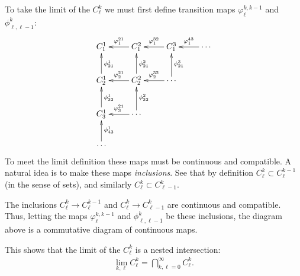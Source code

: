       To take the limit of the $C^k_\ell$ we must first define transition maps $\varphi^{k,k-1}_\ell$ and $\phi^k_{\ell,\ell-1}$:
      \begin{displaymath}
        \xymatrix{
          C^1_1  & C^2_1 \ar[l]_{\varphi^{21}_1} & C^3_1 \ar[l]_{\varphi^{32}_1} & \cdots \ar[l]_{\varphi^{43}_1} \\
          C^1_2 \ar[u]_{\phi^1_{21}} & C^2_2 \ar[l]_{\varphi^{21}_2} \ar[u]_{\phi^2_{21}} & \cdots \ar[l]_{\varphi^{32}_2} \ar[u]_{\phi^3_{21}} \\
          C^1_3 \ar[u]_{\phi^1_{32}} & \cdots \ar[l]_{\varphi^{21}_3} \ar[u]_{\phi^2_{32}} \\
          \cdots \ar[u]_{\phi^1_{43}} 
        }
      \end{displaymath}
      To meet the limit definition these maps must be continuous and compatible.
      A natural idea is to make these maps \emph{inclusions}.
      See that by definition $C^k_\ell\subset C^{k-1}_\ell$ (in the sense of sets), and similarly $C^k_\ell\subset C^k_{\ell-1}$.
      \begin{claim}
        \label{claim:inclcont}
        The inclusions $C^k_\ell\rightarrow C^{k-1}_\ell$ and $C^k_\ell\rightarrow C^k_{\ell-1}$ are continuous and compatible.
        Thus, letting the maps $\varphi^{k,k-1}_\ell$ and $\phi^k_{\ell,\ell-1}$ be these inclusions, the diagram above is a commutative diagram of continuous maps.
      \end{claim}
      \begin{rmk}
        This shows that the limit of the $C^k_\ell$ is a nested intersection:
        \begin{align*}
          \lim_{k,\ell}C^k_\ell = \bigcap_{k,\ell=0}^\infty C^k_\ell\text{.}
        \end{align*}
      \end{rmk}
